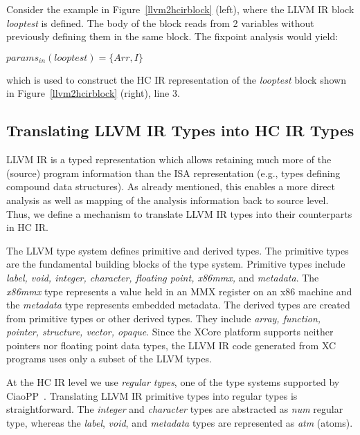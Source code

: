 \documentclass{llncs}
\newcommand{\hcir}{HC IR\xspace}
\newcommand{\llvmir}{LLVM IR\xspace}
\newcommand{\ciaopp}{CiaoPP\xspace}
\begin{document}
Consider the example in Figure~\ref{llvm2hcirblock} (left), where the \llvmir
block \textit{looptest} is defined. The body of the block reads from 2
variables without previously defining them in the same block. The
fixpoint analysis would yield:
\begin{center}
$params_{in}(looptest) = \{Arr, I\}$
\end{center}
which is used to construct the \hcir representation of the \textit{looptest}
block shown in Figure~\ref{llvm2hcirblock} (right), line 3.

\subsection{Translating \llvmir Types into \hcir Types} 

\llvmir is a typed representation which allows retaining much more of
the (source) program information than the ISA representation (e.g.,
types defining compound data structures).
As already mentioned, this enables a more direct analysis as well as
mapping of the analysis information back to source level.
Thus, we define a mechanism to translate \llvmir types into their
counterparts in \hcir.


The LLVM type system defines primitive and derived types. The
primitive types are the fundamental building blocks of the type
system. Primitive types include \textit{label, void, integer,
  character, floating point, x86mmx,} and \textit{metadata}. The
\textit{x86mmx} type represents a value held in an MMX register on an
x86 machine and the \textit{metadata} type represents embedded
metadata. The derived types are created from primitive types or other
derived types. They include \textit{array, function, pointer,
  structure, vector, opaque}. Since the XCore platform 
supports neither pointers nor floating point data types, the \llvmir code
generated from XC programs uses only a subset of the LLVM types.

At the \hcir level we use \emph{regular types}, one of the type
systems supported by \ciaopp~\cite{ciaopp-sas03-journal-scp}.  Translating \llvmir primitive types
into regular types is straightforward. The \textit{integer} and
\textit{character} types are 
abstracted as \textit{num} regular type, whereas the
\textit{label}, \textit{void}, and \textit{metadata} types are
represented as \textit{atm} (atoms). 
\end{document}
